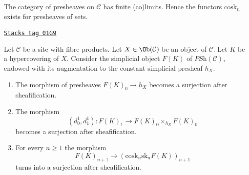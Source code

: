 The category of presheaves on $\mathcal{C}$ has
finite (co)limits. Hence the functors $\text{cosk}_n$
exists for presheaves of sets.

\begin{lemma}[Hypercovering F]
\label{hypercovering-lemma-hypercovering-F}
\href{https://stacks.math.columbia.edu/tag/01G9}{\texttt{Stacks tag 01G9}}

Let $\mathcal{C}$ be a site with fibre products.
Let $X \in \Ob(\mathcal{C})$ be an object of $\mathcal{C}$.
Let $K$ be a hypercovering of $X$.
Consider the simplicial object $F(K)$ of $\textit{PSh}(\mathcal{C})$,
endowed with its augmentation to the constant simplicial presheaf $h_X$.
\begin{enumerate}
\item The morphism of presheaves $F(K)_0 \to h_X$ becomes
a surjection after sheafification.
\item The morphism
$$
(d^1_0, d^1_1) :
F(K)_1
\longrightarrow
F(K)_0 \times_{h_X} F(K)_0
$$
becomes a surjection after sheafification.
\item For every $n \geq 1$ the morphism
$$
F(K)_{n + 1} \longrightarrow (\text{cosk}_n \text{sk}_n F(K))_{n + 1}
$$
turns into a surjection after sheafification.
\end{enumerate}
\end{lemma}

